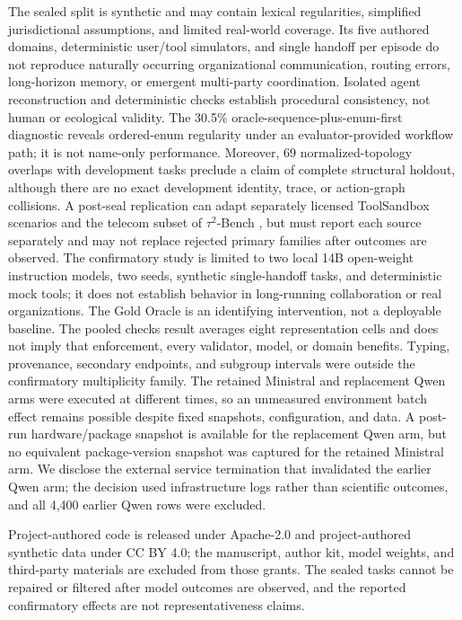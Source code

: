 The sealed split is synthetic and may contain lexical regularities, simplified
jurisdictional assumptions, and limited real-world coverage. Its five authored
domains, deterministic user/tool simulators, and single handoff per episode do
not reproduce naturally occurring organizational communication, routing errors,
long-horizon memory, or emergent multi-party coordination. Isolated agent
reconstruction and deterministic checks establish procedural consistency, not
human or ecological validity.
The 30.5\% oracle-sequence-plus-enum-first diagnostic reveals ordered-enum
regularity under an evaluator-provided workflow path; it is not name-only
performance. Moreover, 69 normalized-topology overlaps with development tasks
preclude a claim of complete structural holdout, although there are no exact
development identity, trace, or action-graph collisions. A
post-seal replication can adapt separately licensed ToolSandbox scenarios and
the telecom subset of $\tau^2$-Bench \citep{lu2025toolsandbox,barres2025tau2},
but must report each source separately and may not replace rejected primary
families after outcomes are observed.
The confirmatory study is limited to two local 14B open-weight instruction
models, two seeds, synthetic single-handoff tasks, and deterministic mock tools;
it does not establish behavior in long-running collaboration or real
organizations. The Gold Oracle is an identifying intervention, not a deployable
baseline. The pooled checks result averages eight representation cells and does
not imply that enforcement, every validator, model, or domain benefits. Typing,
provenance, secondary endpoints, and subgroup intervals were outside the
confirmatory multiplicity family. The retained Ministral and replacement Qwen
arms were executed at different times, so an unmeasured environment batch
effect remains possible despite fixed snapshots, configuration, and data. A
post-run hardware/package snapshot is available for the replacement Qwen arm,
but no equivalent package-version snapshot was captured for the retained
Ministral arm. We
disclose the external service termination that invalidated the earlier Qwen arm;
the decision used infrastructure logs rather than scientific outcomes, and all
4,400 earlier Qwen rows were excluded.

Project-authored code is released under Apache-2.0 and project-authored
synthetic data under CC BY 4.0; the manuscript, author kit, model weights, and
third-party materials are excluded from those grants. The sealed tasks cannot
be repaired or filtered after model outcomes are observed, and the reported
confirmatory effects are not representativeness claims.
